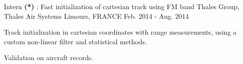 \begin{cventries}

\cventry
{Intern \textbf{(*)} : Fast initialization of cartesian track using FM band} %
{Thales Group, Thales Air Systems} %
{Limours, FRANCE} %
{Feb. 2014 - Aug. 2014} %
{ %
\begin{cvitems}
\item {Track initialization in cartesian coordinates with range measurements, using a custom non-linear filter and statistical methods.}
\item {Validation on aircraft records.}
\end{cvitems}
}
\end{cventries}
